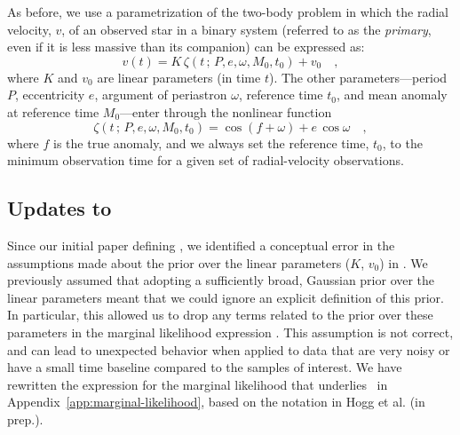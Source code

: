 \documentclass[modern]{aastex63}
\begin{document}
As before, we use a parametrization of the two-body problem in which the radial
velocity, $v$, of an observed star in a binary system (referred to as the
\emph{primary}, even if it is less massive than its companion) can be expressed
as:
\begin{equation}
    v(t) = K \, \zeta(t \,;\, P, e, \omega, M_0, t_0) + v_0 \quad , \label{eq:kepler}
\end{equation}
where $K$ and $v_0$ are linear parameters (in time $t$).
The other parameters---period $P$, eccentricity $e$, argument of periastron
$\omega$, reference time $t_0$, and mean anomaly at reference time $M_0$---enter
through the nonlinear function
\begin{equation}
    \zeta(t \,;\, P, e, \omega, M_0, t_0) =
        \cos\left(f + \omega\right) + e\,\cos\omega \quad , \label{eq:zeta}
\end{equation}
where $f$ is the true anomaly, and we always set the reference time, $t_0$, to
the minimum observation time for a given set of radial-velocity observations.

\subsection{Updates to \thejoker}
\label{sec:joker-update}

Since our initial paper defining \thejoker, we identified a conceptual error in
the assumptions made about the prior over the linear parameters ($K$, $v_0$) in
\citet{thejoker}.
We previously assumed that adopting a sufficiently broad, Gaussian prior over
the linear parameters meant that we could ignore an explicit definition of this
prior.
In particular, this allowed us to drop any terms related to the prior over these
parameters in the marginal likelihood expression \citep[\equationname~11
in][]{thejoker}.
This assumption is not correct, and can lead to unexpected behavior when applied
to data that are very noisy or have a small time baseline compared to the
samples of interest.
We have rewritten the expression for the marginal likelihood that underlies
\thejoker\ in Appendix~\ref{app:marginal-likelihood}, based on the notation in
Hogg et al. (in prep.).
\end{document}
